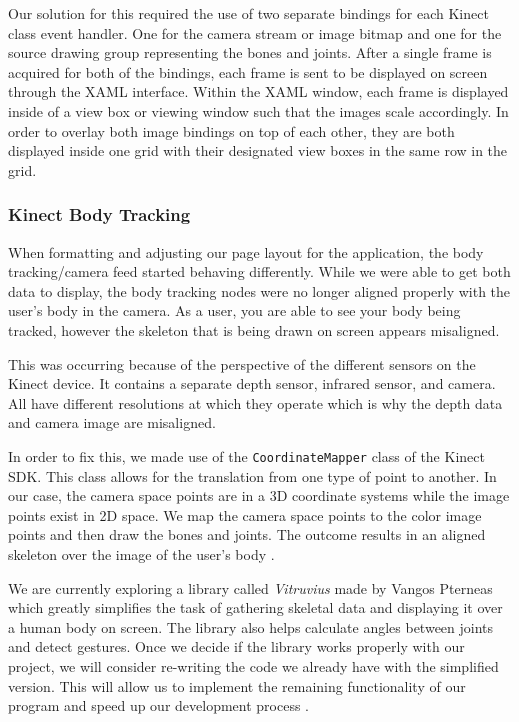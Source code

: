\documentclass[onecolumn, draftclsnofoot,10pt, compsoc]{IEEEtran}
\begin{document}
Our solution for this required the use of two separate bindings for each Kinect class event handler. One for the camera stream or image bitmap and one for the source drawing group representing the bones and joints. After a single frame is acquired for both of the bindings, each frame is sent to be displayed on screen through the XAML interface. Within the XAML window, each frame is displayed inside of a view box or viewing window such that the images scale accordingly. In order to overlay both image bindings on top of each other, they are both displayed inside one grid with their designated view boxes in the same row in the grid.

\subsubsection{Kinect Body Tracking}
When formatting and adjusting our page layout for the application, the body tracking/camera feed started behaving differently. While we were able to get both data to display, the body tracking nodes were no longer aligned properly with the user's body in the camera. As a user, you are able to see your body being tracked, however the skeleton that is being drawn on screen appears misaligned. 

This was occurring because of the perspective of the different sensors on the Kinect device. It contains a separate depth sensor, infrared sensor, and camera. All have different resolutions at which they operate which is why the depth data and camera image are misaligned. 

In order to fix this, we made use of the \texttt{CoordinateMapper} class of the Kinect SDK. This class allows for the translation from one type of point to another. In our case, the camera space points are in a 3D coordinate systems while the image points exist in 2D space. We map the camera space points to the color image points and then draw the bones and joints. The outcome results in an aligned skeleton over the image of the user's body \cite{KinectDevelop}. 

We are currently exploring a library called \textit{Vitruvius} made by Vangos Pterneas which greatly simplifies the task of gathering skeletal data and displaying it over a human body on screen. The library also helps calculate angles between joints and detect gestures. Once we decide if the library works properly with our project, we will consider re-writing the code we already have with the simplified version. This will allow us to implement the remaining functionality of our program and speed up our development process \cite{Vitruvius}.
\end{document}
